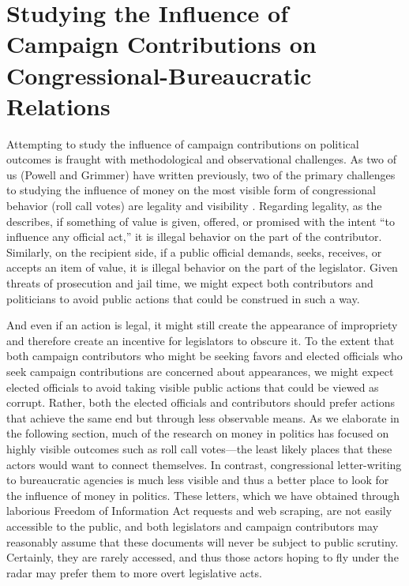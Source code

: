\documentclass{article}
\begin{document}
\section{Studying the Influence of Campaign Contributions on Congressional-Bureaucratic Relations}

Attempting to study the influence of campaign contributions on political outcomes is fraught with methodological and observational challenges.  As two of us (Powell and Grimmer) have written previously, two of the primary challenges to studying the influence of money on the most visible form of congressional behavior (roll call votes) are legality and visibility \citep{PowellGrimmer2016}. Regarding legality, as the \citet{USOGE2013} describes, if something of value is given, offered, or promised with the intent ``to influence any official act,'' it is illegal behavior on the part of the contributor. Similarly, on the recipient side, if a public official demands, seeks, receives, or accepts an item of value, it is illegal behavior on the part of the legislator.  Given threats of prosecution and jail time, we might expect both contributors and politicians to avoid public actions that could be construed in such a way.  

And even if an action is legal, it might still create the appearance of impropriety and therefore create an incentive for legislators to obscure it.  To the extent that both campaign contributors who might be seeking favors and elected officials who seek campaign contributions are concerned about appearances, we might expect elected officials to avoid taking visible public actions that could be viewed as corrupt.  Rather, both the elected officials and contributors should prefer actions that achieve the same end but through less observable means. As we elaborate in the following section, much of the research on money in politics has focused on highly visible outcomes such as roll call votes---the least likely places that these actors would want to connect themselves.  In contrast, congressional letter-writing to bureaucratic agencies is much less visible and thus a better place to look for the influence of money in politics.  These letters, which we have obtained through laborious Freedom of Information Act requests and web scraping, are not easily accessible to the public, and both legislators and campaign contributors may reasonably assume that these documents will never be subject to public scrutiny.  Certainly, they are rarely accessed, and thus those actors hoping to fly under the radar may prefer them to more overt legislative acts. 
\end{document}
